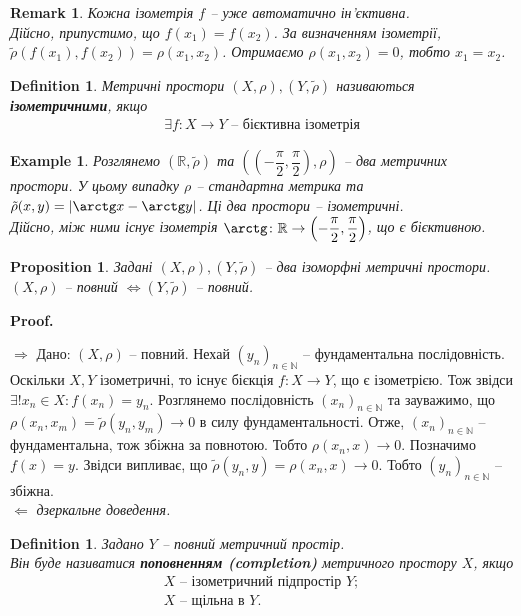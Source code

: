 \documentclass[a4paper, 10pt]{article}
\makeatletter
\def\rightproof{$\boxed{\Rightarrow}$ }
\def\leftproof{$\boxed{\Leftarrow}$ }
\theoremstyle{theoremdd}
\theoremstyle{theoremdd}
\newtheorem{definition}[theorem]{Definition}
\theoremstyle{theoremdd}
\theoremstyle{theoremdd}
\newtheorem{example}[theorem]{Example}
\theoremstyle{theoremdd}
\newtheorem{proposition}[theorem]{Proposition}
\theoremstyle{theoremdd}
\newtheorem{remark}[theorem]{Remark}
\theoremstyle{theoremdd}
\theoremstyle{theoremdd}
\renewenvironment{proof}[1][Proof.\\]{\par
\pushQED{\hfill \qed}%
\normalfont \topsep6\p@\@plus6\p@\relax
\trivlist
\item\relax
{\bfseries
#1\@addpunct{.}}\hspace\labelsep\ignorespaces
}{%
\popQED\endtrivlist\@endpefalse
}
\makeatother
\begin{document}
\begin{remark}
Кожна ізометрія $f$ -- уже автоматично ін'єктивна.\\
Дійсно, припустимо, що $f(x_1) = f(x_2)$. За визначенням ізометрії, $\tilde{\rho}(f(x_1),f(x_2)) = \rho(x_1,x_2)$. Отримаємо $\rho(x_1,x_2) = 0$, тобто $x_1 = x_2$.
\end{remark}

\begin{definition}
Метричні простори $(X,\rho), (Y,\tilde{\rho})$ називаються \textbf{ізометричними}, якщо
\begin{align*}
\exists f \colon X \to Y \text{ -- бієктивна ізометрія}
\end{align*}
\end{definition}

\begin{example}
Розглянемо $(\mathbb{R}, \tilde{\rho})$ та $\left( \left( -\dfrac{\pi}{2}, \dfrac{\pi}{2} \right), \rho \right)$ -- два метричних простори. У цьому випадку $\rho$ -- стандартна метрика та $\tilde{\rho}(x,y) = |\arctg x - \arctg y|$. Ці два простори -- ізометричні.\\
Дійсно, між ними існує ізометрія $\arctg \colon \mathbb{R} \to \left( -\dfrac{\pi}{2}, \dfrac{\pi}{2} \right)$, що є бієктивною.
\end{example}

\begin{proposition}
Задані $(X,\rho), (Y, \tilde{\rho})$ -- два ізоморфні метричні простори.\\
$(X,\rho)$ -- повний $\iff (Y,\tilde{\rho})$ -- повний.
\end{proposition}

\begin{proof}
\rightproof Дано: $(X,\rho)$ -- повний. Нехай $(y_n)_{n \in \mathbb{N}}$ -- фундаментальна послідовність. Оскільки $X,Y$ ізометричні, то існує бієкція $f \colon X \to Y$, що є ізометрією. Тож звідси $\exists !x_n \in X: f(x_n) = y_n$. Розглянемо послідовність $(x_n)_{n \in \mathbb{N}}$ та зауважимо, що $\rho(x_n,x_m) = \tilde{\rho}(y_n,y_m) \to 0$ в силу фундаментальності. Отже, $(x_n)_{n \in \mathbb{N}}$ -- фундаментальна, тож збіжна за повнотою. Тобто $\rho(x_n,x) \to 0$. Позначимо $f(x) = y$. Звідси випливає, що $\tilde{\rho}(y_n,y) = \rho(x_n,x) \to 0$. Тобто $(y_n)_{n \in \mathbb{N}}$ -- збіжна.
\bigskip \\
\leftproof \textit{дзеркальне доведення.}
\end{proof}

\begin{definition}
Задано $Y$ -- повний метричний простір.\\
Він буде називатися \textbf{поповненням (completion)} метричного простору $X$, якщо
\begin{align*}
X \text{ -- ізометричний підпростір } Y; \\
X \text{ -- щільна в } Y.
\end{align*}
\end{definition}
\end{document}
